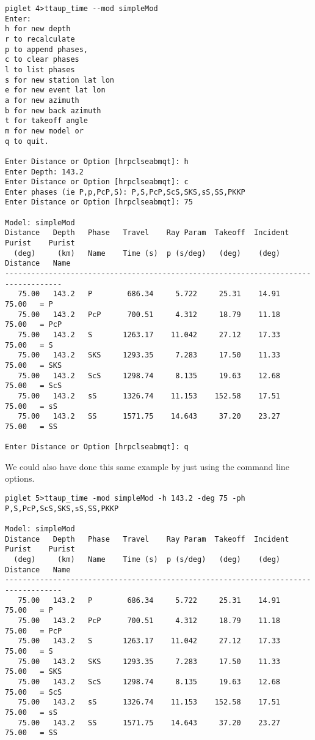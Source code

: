 \begin{verbatim}
piglet 4>ttaup_time --mod simpleMod
Enter:
h for new depth
r to recalculate
p to append phases,
c to clear phases
l to list phases
s for new station lat lon
e for new event lat lon
a for new azimuth
b for new back azimuth
t for takeoff angle
m for new model or
q to quit.

Enter Distance or Option [hrpclseabmqt]: h
Enter Depth: 143.2
Enter Distance or Option [hrpclseabmqt]: c
Enter phases (ie P,p,PcP,S): P,S,PcP,ScS,SKS,sS,SS,PKKP
Enter Distance or Option [hrpclseabmqt]: 75

Model: simpleMod
Distance   Depth   Phase   Travel    Ray Param  Takeoff  Incident  Purist    Purist
  (deg)     (km)   Name    Time (s)  p (s/deg)   (deg)    (deg)   Distance   Name
-----------------------------------------------------------------------------------
   75.00   143.2   P        686.34     5.722     25.31    14.91    75.00   = P
   75.00   143.2   PcP      700.51     4.312     18.79    11.18    75.00   = PcP
   75.00   143.2   S       1263.17    11.042     27.12    17.33    75.00   = S
   75.00   143.2   SKS     1293.35     7.283     17.50    11.33    75.00   = SKS
   75.00   143.2   ScS     1298.74     8.135     19.63    12.68    75.00   = ScS
   75.00   143.2   sS      1326.74    11.153    152.58    17.51    75.00   = sS
   75.00   143.2   SS      1571.75    14.643     37.20    23.27    75.00   = SS

Enter Distance or Option [hrpclseabmqt]: q
\end{verbatim}

We could also have done this same example by just using the command line
options.

\begin{verbatim}
piglet 5>ttaup_time -mod simpleMod -h 143.2 -deg 75 -ph P,S,PcP,ScS,SKS,sS,SS,PKKP

Model: simpleMod
Distance   Depth   Phase   Travel    Ray Param  Takeoff  Incident  Purist    Purist
  (deg)     (km)   Name    Time (s)  p (s/deg)   (deg)    (deg)   Distance   Name
-----------------------------------------------------------------------------------
   75.00   143.2   P        686.34     5.722     25.31    14.91    75.00   = P
   75.00   143.2   PcP      700.51     4.312     18.79    11.18    75.00   = PcP
   75.00   143.2   S       1263.17    11.042     27.12    17.33    75.00   = S
   75.00   143.2   SKS     1293.35     7.283     17.50    11.33    75.00   = SKS
   75.00   143.2   ScS     1298.74     8.135     19.63    12.68    75.00   = ScS
   75.00   143.2   sS      1326.74    11.153    152.58    17.51    75.00   = sS
   75.00   143.2   SS      1571.75    14.643     37.20    23.27    75.00   = SS
\end{verbatim}

